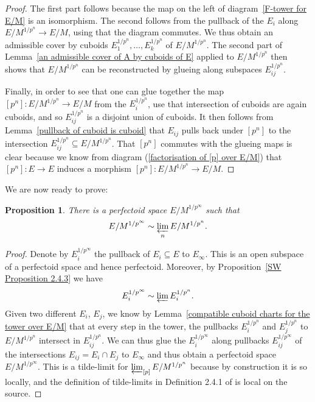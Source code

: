 \documentclass[10pt,oneside]{amsart}
\newtheorem{proposition}[theorem]{Proposition}
\theoremstyle{definition}
\begin{document}
		\begin{proof}
		The first part follows because the map on the left of diagram~\ref{F-tower for E/M} is an isomorphism. The second follows from the pullback of the $E_i$ along $E/M^{1/p^n}\rightarrow E/M$, using that the diagram commutes.
		We thus obtain an admissible cover by cuboids $E_1^{1/p^n},\dots,E_k^{1/p^n}$ of $E/M^{1/p^n}$.
		The second part of Lemma~\ref{an admissible cover of A by cuboids of E} applied to $E/M^{1/p^n}$ then shows that $E/M^{1/p^n}$ can be reconstructed by glueing along subspaces $E_{ij}^{1/p^n}$.
		
		Finally, in order to see that one can glue together the map $[p^n]:E/M^{1/p^n}\rightarrow E/M$ from the $E_i^{1/p^n}$, use that intersection of cuboids are again cuboids, and so $E_{ij}^{1/p^n}$ is a disjoint union of cuboids. It then follows from Lemma~\ref{pullback of cuboid is cuboid} that $E_{ij}$ pulls back under $[p^n]$ to the intersection $E_{ij}^{1/p^n}\subseteq E/M^{1/p^n}$. That $[p^n]$ commutes with the glueing maps is clear because we know from diagram (\ref{factorisation of [p] over E/M}) that $[p^n]:E\rightarrow E$ induces a morphism $[p^n]:E/M^{1/p^n}\rightarrow E/M$.
		\end{proof}
		We are now ready to prove:
		\begin{proposition}\label{explicit construction of vertical tilde-limit}
			There is a perfectoid space $E/M^{1/p^\infty}$ such that\[E/M^{1/p^\infty}\sim \varprojlim_{n}E/M^{1/p^n}. \]
		\end{proposition}
		\begin{proof}
		 Denote by $E_i^{1/p^\infty}$ the pullback of $E_i\subseteq E$ to $E_\infty$. This is an open subspace of a perfectoid space and hence perfectoid. Moreover, by Proposition~\ref{SW Proposition 2.4.3} we have  \[ E_i^{1/p^\infty}\sim \varprojlim E_i^{1/p^n}.\] 
		Given two different $E_i$, $E_j$, we know by Lemma~\ref{compatible cuboid charts for the tower over E/M} that at every step in the tower, the pullbacks $E_i^{1/p^n}$ and $E_j^{1/p^n}$ to $E/M^{1/p^n}$ intersect in  $E_{ij}^{1/p^n}$.
		We can thus glue the $E_i^{1/p^\infty}$ along pullbacks $E_{ij}^{1/p^\infty}$ of the intersections $E_{ij}=E_i\cap E_j$ to $E_\infty$ and thus obtain a perfectoid space $E/M^{1/p^\infty}$. This is a tilde-limit for $\varprojlim_{[p]}E/M^{1/p^n}$ because by construction it is so locally, and the definition of tilde-limits in Definition 2.4.1 of \cite{SW} is local on the source.
		\end{proof}
	 
\end{document}
